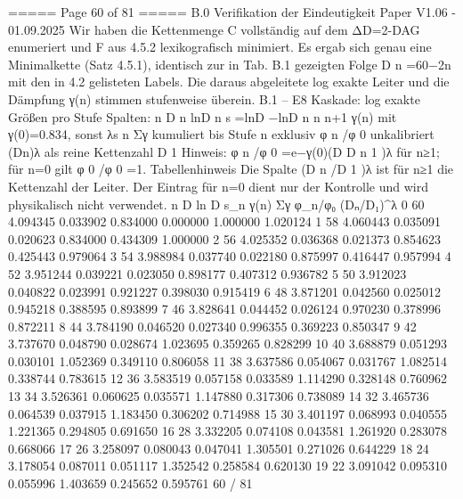 \begin{MyVerbatim}
{{===== Page 60 of 81 =====
B.0 Verifikation der Eindeutigkeit
Paper V1.06 - 01.09.2025
Wir haben die Kettenmenge C vollständig auf dem ΔD=2-DAG enumeriert und F aus 4.5.2 lexikografisch minimiert. Es
ergab sich genau eine Minimalkette (Satz 4.5.1), identisch zur in Tab. B.1 gezeigten Folge D n =60−2n mit den in 4.2
gelisteten Labels. Die daraus abgeleitete log exakte Leiter und die Dämpfung γ(n) stimmen stufenweise überein.
B.1 – E8 Kaskade: log exakte Größen pro Stufe
Spalten:
n
D
n
lnD
n
s =lnD −lnD
n n n+1
γ(n) mit γ(0)=0.834, sonst λs n
Σγ kumuliert bis Stufe n exklusiv
φ n /φ 0 unkalibriert
(Dn)λ
als reine Kettenzahl
D
1
Hinweis: φ n /φ 0 =e−γ(0)(D D n 1 )λ für n≥1; für n=0 gilt φ 0 /φ 0 =1.
Tabellenhinweis
Die Spalte (D n /D 1 )λ ist für n≥1 die Kettenzahl der Leiter. Der Eintrag für n=0 dient nur der Kontrolle und wird
physikalisch nicht verwendet.
n D ln D s_n γ(n) Σγ φ_n/φ₀ (Dₙ/D₁)^λ
0 60 4.094345 0.033902 0.834000 0.000000 1.000000 1.020124
1 58 4.060443 0.035091 0.020623 0.834000 0.434309 1.000000
2 56 4.025352 0.036368 0.021373 0.854623 0.425443 0.979064
3 54 3.988984 0.037740 0.022180 0.875997 0.416447 0.957994
4 52 3.951244 0.039221 0.023050 0.898177 0.407312 0.936782
5 50 3.912023 0.040822 0.023991 0.921227 0.398030 0.915419
6 48 3.871201 0.042560 0.025012 0.945218 0.388595 0.893899
7 46 3.828641 0.044452 0.026124 0.970230 0.378996 0.872211
8 44 3.784190 0.046520 0.027340 0.996355 0.369223 0.850347
9 42 3.737670 0.048790 0.028674 1.023695 0.359265 0.828299
10 40 3.688879 0.051293 0.030101 1.052369 0.349110 0.806058
11 38 3.637586 0.054067 0.031767 1.082514 0.338744 0.783615
12 36 3.583519 0.057158 0.033589 1.114290 0.328148 0.760962
13 34 3.526361 0.060625 0.035571 1.147880 0.317306 0.738089
14 32 3.465736 0.064539 0.037915 1.183450 0.306202 0.714988
15 30 3.401197 0.068993 0.040555 1.221365 0.294805 0.691650
16 28 3.332205 0.074108 0.043581 1.261920 0.283078 0.668066
17 26 3.258097 0.080043 0.047041 1.305501 0.271026 0.644229
18 24 3.178054 0.087011 0.051117 1.352542 0.258584 0.620130
19 22 3.091042 0.095310 0.055996 1.403659 0.245652 0.595761
60 / 81

}}
\end{MyVerbatim}
